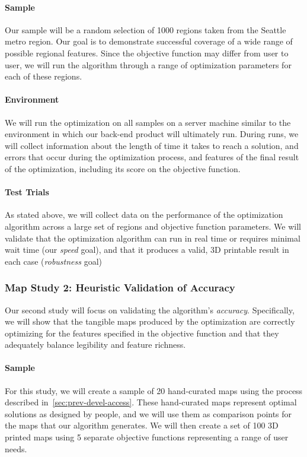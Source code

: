 \paragraph{Sample} 
Our sample will be a random selection of 1000 regions taken from the Seattle metro region. Our goal is to demonstrate successful coverage of a wide range of possible regional features. Since the objective function may differ from user to user, we will run the algorithm through a range of optimization parameters for each of these regions. 


\paragraph{Environment}
We will run the optimization on all samples on a server machine similar to the environment in which our back-end product will ultimately run. During runs, we will collect information about the length of time it takes to reach a solution, and errors that occur during the optimization process, and features of the final result of the optimization, including its score on the objective function. 

\paragraph{Test Trials}
As stated above, we will collect data on the performance of the optimization algorithm across a large set of regions and objective function parameters. We will validate that the optimization algorithm can run in real time or requires minimal wait time (our {\em speed} goal), and that it  produces a valid, 3D printable result in each case ({\em robustness} goal)

\subsubsection{Map Study 2: Heuristic Validation of Accuracy}
\label{sec:technical-validation}
Our second  study will focus on validating the algorithm's {\em accuracy}. Specifically, we will show that the tangible maps produced by the optimization are correctly optimizing for the features specified in the objective function and that they adequately balance legibility and feature richness.  

\paragraph{Sample} 
For this study, we will create a sample of 20 hand-curated maps using the process described in~\ref{sec:prev-devel-access}. These hand-curated maps represent optimal solutions as designed by people, and we will use them as comparison points for the maps that our algorithm generates.  We will then create a set of 100 3D printed maps using 5 separate objective functions representing a range of user needs.

